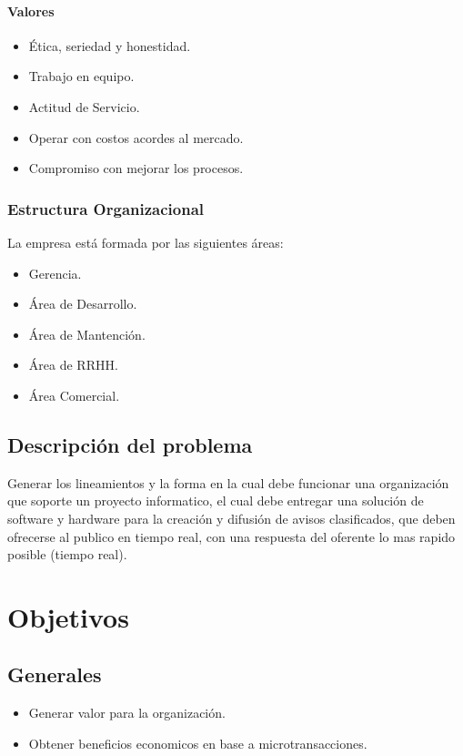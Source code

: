 \documentclass[letterpaper,openright,10pt,oneside]{report}
\begin{document}
			 \subsubsection{Valores}
			 	\begin{itemize}
					\item Ética, seriedad y honestidad.
					\item Trabajo en equipo.
					\item Actitud de Servicio.
					\item Operar con costos acordes al mercado.
					\item Compromiso con mejorar los procesos.
\end{itemize}
			\subsection{Estructura Organizacional}
				La empresa está formada por las siguientes áreas:
				\begin{itemize}
					\item Gerencia.
					\item Área de Desarrollo.
					\item Área de Mantención.
					\item Área de RRHH.
					\item Área Comercial.
\end{itemize}
		\section{Descripción del problema}
		Generar los lineamientos y la forma en la cual debe funcionar una organización que soporte un proyecto informatico, el cual debe entregar una solución de software y hardware para la creación y difusión de avisos clasificados, que deben ofrecerse al publico en tiempo real, con una respuesta del oferente lo mas rapido posible (tiempo real).
	\chapter{Objetivos}
		\section{Generales}
			\begin{itemize}
				\item Generar valor para la organización.
				\item Obtener beneficios economicos en base a microtransacciones.
			\end{itemize}
\end{document}
